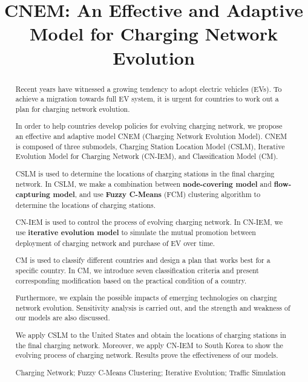 \documentclass{mcmthesis}
\begin{document}
\linespread{1} %
\setlength{\parskip}{0.5\baselineskip} %
\title{CNEM: An Effective and Adaptive Model for Charging Network Evolution}
\date{}

\begin{abstract}
Recent years have witnessed a growing tendency to adopt electric vehicles (EVs). To achieve a migration towards full EV system, it is urgent for countries to work out a plan for charging network evolution.

In order to help countries develop policies for evolving charging network, we propose an effective and adaptive model CNEM (Charging Network Evolution Model). CNEM is composed of three submodels, Charging Station Location Model (CSLM), Iterative Evolution Model for Charging Network (CN-IEM), and Classification Model (CM).

CSLM is used to determine the locations of charging stations in the final charging network. In CSLM, we make a combination between \textbf{node-covering model} and \textbf{flow-capturing model}, and use \textbf{Fuzzy C-Means} (FCM) clustering algorithm to determine the locations of charging stations.

CN-IEM is used to control the process of evolving charging network. In CN-IEM, we use \textbf{iterative evolution model} to simulate the mutual promotion between deployment of charging network and purchase of EV over time.

CM is used to classify different countries and design a plan that works best for a specific country. In CM, we introduce seven classification criteria and present corresponding modification based on the practical condition of a country.

Furthermore, we explain the possible impacts of emerging technologies on charging network evolution. Sensitivity analysis is carried out, and the strength and weakness of our models are also discussed.

We apply CSLM to the United States and obtain the locations of charging stations in the final charging network. Moreover, we apply CN-IEM to South Korea to show the evolving process of charging network. Results prove the effectiveness of our models.
\begin{keywords}
Charging Network; Fuzzy C-Means Clustering; Iterative Evolution; Traffic Simulation
\end{keywords}
\end{abstract}

\maketitle
\end{document}
